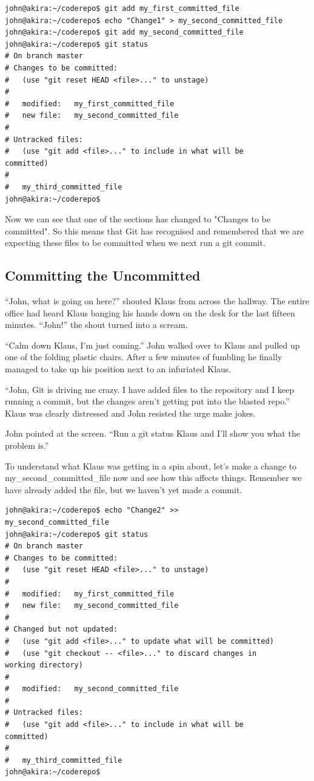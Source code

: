 \begin{Verbatim}[frame=single,fontsize=\relsize{-3}] 
john@akira:~/coderepo$ git add my_first_committed_file
john@akira:~/coderepo$ echo "Change1" > my_second_committed_file 
john@akira:~/coderepo$ git add my_second_committed_file
john@akira:~/coderepo$ git status
# On branch master
# Changes to be committed:
#   (use "git reset HEAD <file>..." to unstage)
#
#	modified:   my_first_committed_file
#	new file:   my_second_committed_file
#
# Untracked files:
#   (use "git add <file>..." to include in what will be 
committed)
#
#	my_third_committed_file
john@akira:~/coderepo$ 
\end{Verbatim} 

Now we can see that one of the sections has changed to "Changes to be committed".  So this means that Git has recognised and remembered that we are expecting these files to be committed when we next run a git commit.  

\subsection{Committing the Uncommitted}

\begin{trenches}
``John, what is going on here?'' shouted Klaus from across the hallway.  The entire office had heard Klaus banging his hands down on the desk for the last fifteen minutes.  ``John!'' the shout turned into a scream.

``Calm down Klaus, I'm just coming.''  John walked over to Klaus and pulled up one of the folding plastic chairs.  After a few minutes of fumbling he finally managed to take up his position next to an infuriated Klaus.

``John, Git is driving me crazy.  I have added files to the repository and I keep running a commit, but the changes aren't getting put into the blasted repo.''  Klaus was clearly distressed and John resisted the urge make jokes.

John pointed at the screen.  ``Run a git status Klaus and I'll show you what the problem is.''
\end{trenches}

To understand what Klaus was getting in a spin about, let's make a change to my\_second\_committed\_file now and see how this affects things.  Remember we have already added the file, but we haven't yet made a commit.

\begin{Verbatim}[frame=single,fontsize=\relsize{-3}] 
john@akira:~/coderepo$ echo "Change2" >> 
my_second_committed_file 
john@akira:~/coderepo$ git status
# On branch master
# Changes to be committed:
#   (use "git reset HEAD <file>..." to unstage)
#
#	modified:   my_first_committed_file
#	new file:   my_second_committed_file
#
# Changed but not updated:
#   (use "git add <file>..." to update what will be committed)
#   (use "git checkout -- <file>..." to discard changes in 
working directory)
#
#	modified:   my_second_committed_file
#
# Untracked files:
#   (use "git add <file>..." to include in what will be 
committed)
#
#	my_third_committed_file
john@akira:~/coderepo$ 
\end{Verbatim} 

